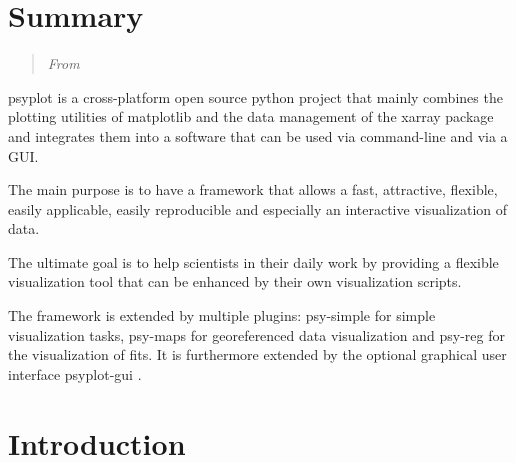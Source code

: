 

\label{chp:psyplot}

\begin{refsection}


\section{Summary}  \label{sec:psyplot-joss}

\blockquote{
	\textit{From}
}

\noindent psyplot \citep{Sommer2017} is a cross-platform open source python project that mainly combines the plotting utilities of matplotlib \citep{Hunter2007} and the data management of the xarray \citep{HoyerHamman2017} package and integrates them into a software that can be used via command-line and via a GUI.

The main purpose is to have a framework that allows a fast, attractive, flexible, easily applicable, easily reproducible and especially an interactive visualization of data.
 
The ultimate goal is to help scientists in their daily work by providing a flexible visualization tool that can be enhanced by their own visualization scripts.

The framework is extended by multiple plugins: psy-simple \citep{Sommer2017b} for simple visualization tasks, psy-maps \citep{Sommer2017c} for georeferenced data visualization and psy-reg \citep{Sommer2017d} for the visualization of fits. It is furthermore extended by the optional graphical user interface psyplot-gui \citep{Sommer2017e}.


\section{Introduction}  \label{sec:psyplot-review}


\end{refsection}

